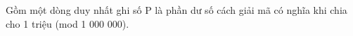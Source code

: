 Gồm một dòng duy nhất ghi số P là phần dư số cách giải mã có nghĩa khi chia cho 1 triệu (mod 1 000 000).